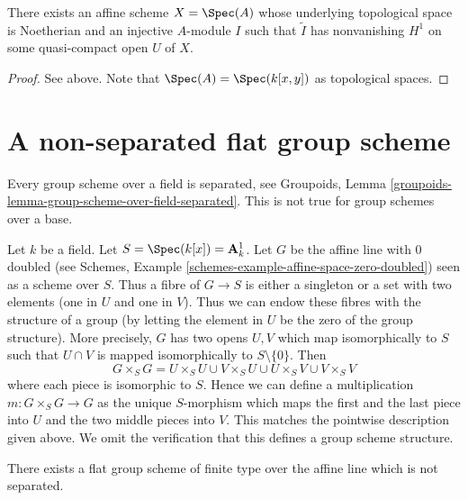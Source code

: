 \begin{lemma}
\label{lemma-nonvanishing}
There exists an affine scheme $X = \Spec(A)$ whose underlying
topological space is Noetherian and an injective
$A$-module $I$ such that $\widetilde{I}$ has nonvanishing $H^1$
on some quasi-compact open $U$ of $X$.
\end{lemma}

\begin{proof}
See above. Note that $\Spec(A) = \Spec(k[x, y])$ as topological spaces.
\end{proof}









\section{A non-separated flat group scheme}
\label{section-non-separated-group-scheme}

\noindent
Every group scheme over a field is separated, see
Groupoids, Lemma \ref{groupoids-lemma-group-scheme-over-field-separated}.
This is not true for group schemes over a base.

\medskip\noindent
Let $k$ be a field. Let $S = \Spec(k[x]) = \mathbf{A}^1_k$.
Let $G$ be the affine line with $0$ doubled (see
Schemes, Example \ref{schemes-example-affine-space-zero-doubled})
seen as a scheme over $S$. Thus a fibre of $G \to S$ is either a
singleton or a set with two elements (one in $U$ and one in $V$).
Thus we can endow these fibres with the structure of a group (by
letting the element in $U$ be the zero of the group structure).
More precisely, $G$ has two opens $U, V$ which map isomorphically
to $S$ such that $U \cap V$ is mapped isomorphically to
$S \setminus \{0\}$. Then
$$
G \times_S G = U \times_S U \cup V \times_S U \cup
U \times_S V \cup V \times_S V
$$
where each piece is isomorphic to $S$. Hence we can define a multiplication
$m : G \times_S G \to G$ as the unique $S$-morphism which maps the first
and the last piece into $U$ and the two middle pieces into $V$. This matches
the pointwise description given above. We omit the
verification that this defines a group scheme structure.

\begin{lemma}
\label{lemma-non-separated-group-scheme}
There exists a flat group scheme of finite type over the affine line
which is not separated.
\end{lemma}

